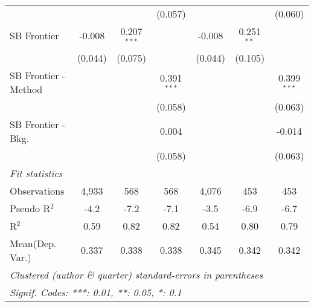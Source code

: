 \begin{tabular}{lcccccc}
                        &         &               & (0.057)       &         &              & (0.060)\\   
   SB Frontier          & -0.008  & 0.207$^{***}$ &               & -0.008  & 0.251$^{**}$ &   \\   
                        & (0.044) & (0.075)       &               & (0.044) & (0.105)      &   \\   
   SB Frontier - Method &         &               & 0.391$^{***}$ &         &              & 0.399$^{***}$\\   
                        &         &               & (0.058)       &         &              & (0.063)\\   
   SB Frontier - Bkg.   &         &               & 0.004         &         &              & -0.014\\   
                        &         &               & (0.058)       &         &              & (0.063)\\   
   \midrule
   \emph{Fit statistics}\\
   Observations         & 4,933   & 568           & 568           & 4,076   & 453          & 453\\  
   Pseudo R$^2$         & -4.2    & -7.2          & -7.1          & -3.5    & -6.9         & -6.7\\  
   R$^2$                & 0.59    & 0.82          & 0.82          & 0.54    & 0.80         & 0.79\\  
Mean(Dep. Var.) & 0.337 & 0.338 & 0.338 & 0.345 & 0.342 & 0.342 \\
   \midrule \midrule
   \multicolumn{7}{l}{\emph{Clustered (author \& quarter) standard-errors in parentheses}}\\
   \multicolumn{7}{l}{\emph{Signif. Codes: ***: 0.01, **: 0.05, *: 0.1}}\\
\end{tabular}
\par\endgroup
